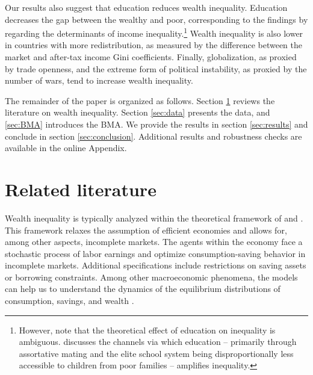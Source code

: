 \documentclass[a4paper,11pt]{article}
\begin{document}
Our results also suggest that education reduces wealth inequality. Education decreases the gap between the wealthy and poor, corresponding to the findings by \citet{dabla2015causes} regarding the determinants of income inequality.\footnote{However, note that the theoretical effect of education on inequality is ambiguous. \citet{scheidel} discusses the channels via which education -- primarily through assortative mating and the elite school system being disproportionally less accessible to children from poor families -- amplifies inequality.} Wealth inequality is also lower in countries with more redistribution, as measured by the difference between the market and after-tax income Gini coefficients. Finally, globalization, as proxied by trade openness, and the extreme form of political instability, as proxied by the number of wars, tend to increase wealth inequality. 

The remainder of the paper is organized as follows. Section \ref{sec:literature} reviews the literature on wealth inequality. Section \ref{sec:data} presents the data, and \ref{sec:BMA} introduces the \ac{BMA}. We provide the results in section \ref{sec:results} and conclude in section \ref{sec:conclusion}. Additional results and robustness checks are available in the online Appendix.

\section{Related literature}
\label{sec:literature}

Wealth inequality is typically analyzed within the theoretical framework of \citet{bewley1977permanent} and \citet{Ayiagari1994}. This framework relaxes the assumption of efficient economies and allows for, among other aspects, incomplete markets. The agents within the economy face a stochastic process of labor earnings and optimize consumption-saving behavior in incomplete markets. Additional specifications include restrictions on saving assets or borrowing constraints. Among other macroeconomic phenomena, the models can help us to understand the dynamics of the equilibrium distributions of consumption, savings, and wealth \citep{BENHABIB2015489}.
\end{document}
